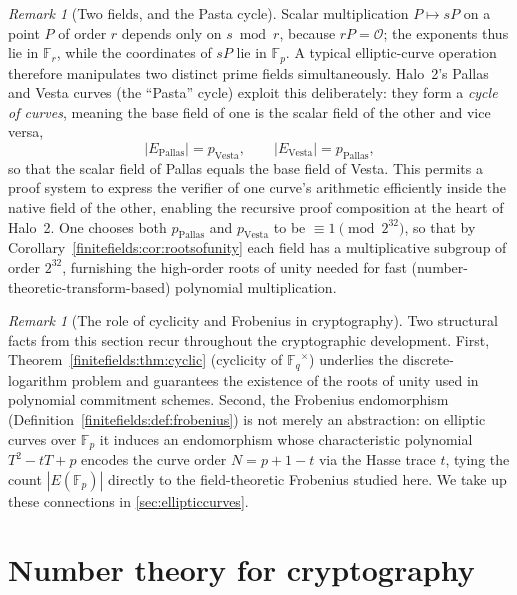 \documentclass[11pt,a4paper]{article}
\theoremstyle{definition}
\theoremstyle{remark}
\newtheorem{remark}[theorem]{Remark}
\newcommand{\Fp}{\ensuremath{\mathbb{F}_{p}}}
\newcommand{\Fq}{\ensuremath{\mathbb{F}_{q}}}
\newcommand{\Fr}{\ensuremath{\mathbb{F}_{r}}}
\begin{document}
\begin{remark}[Two fields, and the Pasta cycle]
\label{finitefields:rem:pasta}
Scalar multiplication \(P \mapsto sP\) on a point \(P\) of order \(r\) depends only on \(s \bmod r\), because \(rP = \mathcal O\); the exponents thus lie in \(\Fr\), while the coordinates of \(sP\) lie in \(\Fp\). A typical elliptic-curve operation therefore manipulates two distinct prime fields simultaneously. Halo~2's Pallas and Vesta curves (the ``Pasta'' cycle) exploit this deliberately: they form a \emph{cycle of curves}, meaning the base field of one is the scalar field of the other and vice versa,
\[
  |E_{\text{Pallas}}| = p_{\text{Vesta}}, \qquad |E_{\text{Vesta}}| = p_{\text{Pallas}},
\]
so that the scalar field of Pallas equals the base field of Vesta. This permits a proof system to express the verifier of one curve's arithmetic efficiently inside the native field of the other, enabling the recursive proof composition at the heart of Halo~2. One chooses both \(p_{\text{Pallas}}\) and \(p_{\text{Vesta}}\) to be \(\equiv 1 \pmod{2^{32}}\), so that by Corollary~\ref{finitefields:cor:rootsofunity} each field has a multiplicative subgroup of order \(2^{32}\), furnishing the high-order roots of unity needed for fast (number-theoretic-transform-based) polynomial multiplication.
\end{remark}

\begin{remark}[The role of cyclicity and Frobenius in cryptography]
\label{finitefields:rem:cryptosummary}
Two structural facts from this section recur throughout the cryptographic development. First, Theorem~\ref{finitefields:thm:cyclic} (cyclicity of \(\Fq^\times\)) underlies the discrete-logarithm problem and guarantees the existence of the roots of unity used in polynomial commitment schemes. Second, the Frobenius endomorphism (Definition~\ref{finitefields:def:frobenius}) is not merely an abstraction: on elliptic curves over \(\Fp\) it induces an endomorphism whose characteristic polynomial \(T^2 - tT + p\) encodes the curve order \(N = p + 1 - t\) via the Hasse trace \(t\), tying the count \(|E(\Fp)|\) directly to the field-theoretic Frobenius studied here. We take up these connections in \cref{sec:ellipticcurves}.
\end{remark}

\clearpage

\section{Number theory for cryptography}\label{sec:numbertheory}
\end{document}
